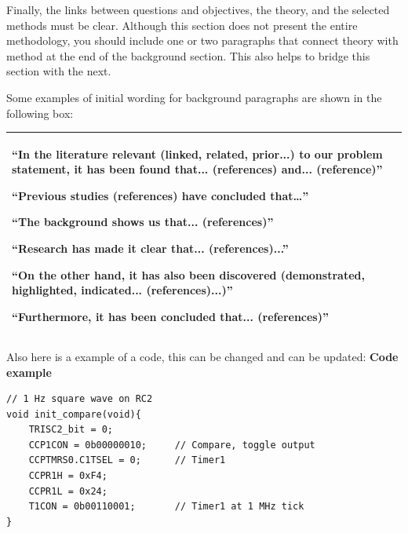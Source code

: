 Finally, the links between questions and objectives, the theory, and the selected methods must be clear. Although this section does not present the entire methodology, you should include one or two paragraphs that connect theory with method at the end of the background section. This also helps to bridge this section with the next.

Some examples of initial wording for background paragraphs are shown in the following box:

\vspace{0.5cm}

\begin{table}[h]
	\begin{tabular}{| m{12cm} |}
		\hline
		\vspace{0.5cm}
		“In the literature relevant (linked, related, prior...) to our problem statement, it has been found that... (references) and... (reference)”

		\vspace{0.5cm}

		“Previous studies (references) have concluded that…”

		\vspace{0.5cm}

		“The background shows us that... (references)”

		\vspace{0.5cm}

		“Research has made it clear that... (references)...”

		\vspace{0.5cm}

		“On the other hand, it has also been discovered (demonstrated, highlighted, indicated... (references)...)”

		\vspace{0.5cm}

		“Furthermore, it has been concluded that... (references)”

		\vspace{0.5cm}

		\\
		\hline
	\end{tabular}
\end{table}

Also here is a example of a code, this can be changed and can be updated:
\noindent\textbf{Code example}
\begin{lstlisting}
// 1 Hz square wave on RC2
void init_compare(void){
    TRISC2_bit = 0;
    CCP1CON = 0b00000010;     // Compare, toggle output
    CCPTMRS0.C1TSEL = 0;      // Timer1
    CCPR1H = 0xF4;            
    CCPR1L = 0x24;
    T1CON = 0b00110001;       // Timer1 at 1 MHz tick
}
\end{lstlisting}
